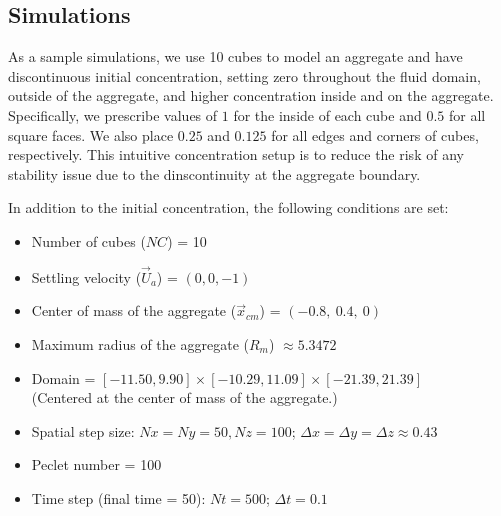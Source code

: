 \subsection{Simulations}
As a sample simulations, we use 10 cubes to model an aggregate and have discontinuous initial concentration, setting zero throughout the fluid domain, outside of the aggregate, and higher concentration inside and on the aggregate. Specifically, we prescribe values of $1$ for the inside of each cube and $0.5$ for all square faces. We also place $0.25$ and $0.125$ for all edges and corners of cubes, respectively. 
This intuitive concentration setup is to reduce the risk of any stability issue due to the dinscontinuity at the aggregate boundary. 

In addition to the initial concentration, the following conditions are set:
\begin{framed}
\begin{itemize}
	\item Number of cubes ($NC$) = 10
	\item Settling velocity ($\vec{U}_a$) = $(0,0,-1)$
	\item Center of mass of the aggregate ($\vec{x}_{cm}$) = $(-0.8, \  0.4, \ 0)$
	\item Maximum radius of the aggregate ($R_m$) $\approx 5.3472$
	\item Domain = $[-11.50, 9.90] \times [-10.29, 11.09] \times [-21.39, 21.39]$\\
	(Centered at the center of mass of the aggregate.)
	\item Spatial step size: $Nx = Ny = 50, Nz = 100$; $\Delta x = \Delta y = \Delta z \approx 0.43$
	\item Peclet number = 100
	\item Time step (final time = 50): $Nt = 500$; $\Delta t = 0.1$
\end{itemize}
\end{framed}

